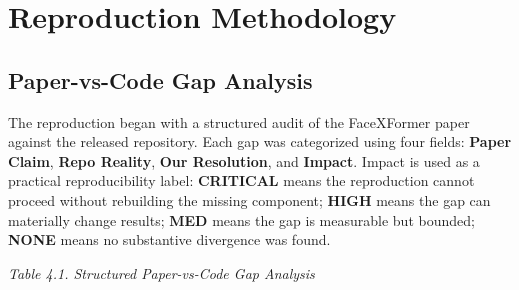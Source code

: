 \documentclass[11pt]{article}
\begin{document}
\section{Reproduction Methodology}


\subsection{Paper-vs-Code Gap Analysis}


The reproduction began with a structured audit of the FaceXFormer paper against the released repository. Each gap was categorized using four fields: \textbf{Paper Claim}, \textbf{Repo Reality}, \textbf{Our Resolution}, and \textbf{Impact}. Impact is used as a practical reproducibility label: \textbf{CRITICAL} means the reproduction cannot proceed without rebuilding the missing component; \textbf{HIGH} means the gap can materially change results; \textbf{MED} means the gap is measurable but bounded; \textbf{NONE} means no substantive divergence was found.


\emph{Table 4.1. Structured Paper-vs-Code Gap Analysis}
\end{document}
